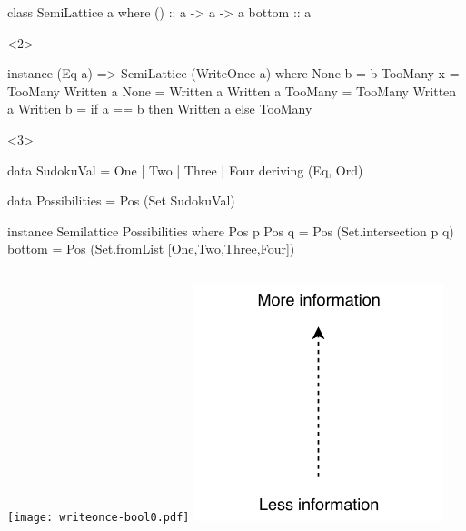 \documentclass[UKenglish,usenames,dvipsnames,svgnames,table,aspectratio=169,mathserif]{beamer}
\newcommand{\nl}{\vspace{\baselineskip}}
\begin{document}
\begin{frame}[fragile]

\begin{overlayarea}{\textwidth}{0.5\textheight}
\begin{haskellcode}
class SemiLattice a where
  (\/)   :: a -> a -> a
  bottom :: a
\end{haskellcode}
\nl

\begin{onlyenv}<2>
\begin{haskellcode}
instance (Eq a) => SemiLattice (WriteOnce a) where
  None      \/ b           = b
  TooMany   \/ x           = TooMany
  Written a \/ None        = Written a
  Written a \/ TooMany     = TooMany
  Written a \/ Written b   = if a == b then Written a else TooMany
\end{haskellcode}
\end{onlyenv}
\begin{onlyenv}<3>
\begin{haskellcode}
data SudokuVal = One | Two | Three | Four deriving (Eq, Ord)

data Possibilities = Pos (Set SudokuVal)

instance Semilattice Possibilities where
  Pos p \/ Pos q = Pos (Set.intersection p q)
  bottom = Pos (Set.fromList [One,Two,Three,Four])
\end{haskellcode}
\end{onlyenv}
\end{overlayarea}
\end{frame}


\begin{frame}
\begin{columns}
\texttt{[image: writeonce-bool0.pdf]}
\includegraphics[scale=1.3]{set/more-info.pdf}
\end{columns}
\end{frame}
\end{document}
